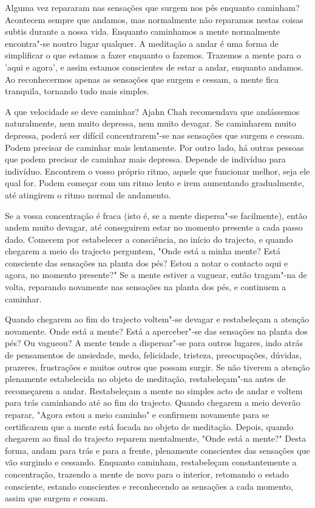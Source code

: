Alguma vez repararam nas sensações que surgem nos pés enquanto caminham?
Acontecem sempre que andamos, mas normalmente não reparamos nestas
coisas subtis durante a nossa vida. Enquanto caminhamos a mente
normalmente encontra"-se noutro lugar qualquer. A meditação a andar é uma
forma de simplificar o que estamos a fazer enquanto o fazemos. Trazemos
a mente para o 'aqui e agora', e assim estamos conscientes de estar a
andar, enquanto andamos. Ao reconhecermos apenas as sensações que surgem
e cessam, a mente fica tranquila, tornando tudo mais simples.

A que velocidade se deve caminhar? Ajahn Chah recomendava que
andássemos naturalmente, nem muito depressa, nem muito devagar. Se
caminharem muito depressa, poderá ser difícil concentrarem"-se nas
sensações que surgem e cessam. Podem precisar de caminhar mais
lentamente. Por outro lado, há outras pessoas que podem precisar de
caminhar mais depressa. Depende de indivíduo para indivíduo. Encontrem o
vosso próprio ritmo, aquele que funcionar melhor, seja ele qual for.
Podem começar com um ritmo lento e irem aumentando gradualmente, até
atingirem o ritmo normal de andamento.

Se a vossa concentração é fraca (isto é, se a mente dispersa"-se facilmente),
então andem muito devagar, até conseguirem estar no momento presente a
cada passo dado. Comecem por estabelecer a consciência, no início do
trajecto, e quando chegarem a meio do trajecto perguntem, "Onde está a minha
mente? Está consciente das sensações na planta dos pés? Estou a notar o
contacto aqui e agora, no momento presente?" Se a mente estiver a
vaguear, então tragam"-na de volta, reparando novamente nas sensações na
planta dos pés, e continuem a caminhar.

Quando chegarem ao fim do trajecto voltem"-se devagar e restabeleçam a atenção novamente. Onde está a mente? Está a aperceber"-se das sensações
na planta dos pés? Ou vagueou? A mente tende a dispersar"-se para outros
lugares, indo atrás de pensamentos de ansiedade, medo, felicidade,
tristeza, preocupações, dúvidas, prazeres, frustrações e muitos outros
que possam surgir. Se não tiverem a atenção plenamente estabelecida no
objeto de meditação, restabeleçam"-na antes de recomeçarem a andar.
Restabeleçam a mente no simples acto de andar e voltem para trás
caminhando até ao fim do trajecto. Quando chegarem a meio deverão
reparar, "Agora estou a meio caminho" e confirmem novamente para se
certificarem que a mente está focada no objeto de meditação. Depois,
quando chegarem ao final do trajecto reparem mentalmente, "Onde está a
mente?" Desta forma, andam para trás e para a frente, plenamente
conscientes das sensações que vão surgindo e cessando. Enquanto
caminham, restabeleçam constantemente a concentração, trazendo a mente de
novo para o interior, retomando o estado consciente, estando conscientes e
reconhecendo as sensações a cada momento, assim que surgem e cessam.

